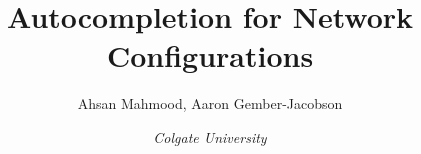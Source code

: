 \documentclass[letterpaper,11pt]{article}
\begin{document}
\title{Autocompletion for Network Configurations}
\author{Ahsan Mahmood, Aaron Gember-Jacobson}
\date{\em Colgate University}
\maketitle






\begin{small}


\end{small}
\end{document}
